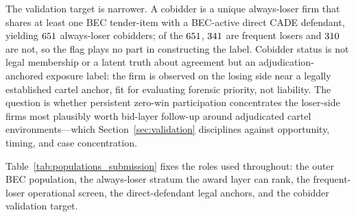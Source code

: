 The validation target is narrower. A cobidder is a unique always-loser
firm that shares at least one BEC tender-item with a BEC-active direct
CADE defendant, yielding $651$ always-loser cobidders; of
the $651$, $341$ are frequent losers and
$310$ are not, so the flag plays no part in constructing
the label. Cobidder status is not legal membership or a latent truth
about agreement but an adjudication-anchored exposure label: the firm
is observed on the losing side near a legally established cartel anchor,
fit for evaluating forensic priority, not liability. The question is
whether persistent zero-win participation concentrates the loser-side
firms most plausibly worth bid-layer follow-up around adjudicated
cartel environments---which Section~\ref{sec:validation} disciplines
against opportunity, timing, and case concentration.

Table~\ref{tab:populations_submission} fixes the roles used
throughout: the outer BEC population, the always-loser stratum the
award layer can rank, the frequent-loser operational screen, the
direct-defendant legal anchors, and the cobidder validation target.

